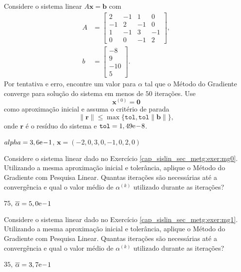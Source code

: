 \begin{exer}\label{cap_sislin_sec_metg:exer:mg1}
  Considere o sistema linear $A\pmb{x} = \pmb{b}$ com
  \begin{align}
    A &=
    \begin{bmatrix}
      2 & -1 & 1 & 0\\
      -1 & 2 & -1 & 0\\
      1 & -1 & 3 & -1 \\
      0 & 0 & -1 & 2
    \end{bmatrix},\\
    b &=
    \begin{bmatrix}
      -8\\
      9\\
      -10\\
      5
    \end{bmatrix}.
  \end{align}
  Por tentativa e erro, encontre um valor para $\alpha$ tal que o Método do Gradiente converge para solução do sistema em menos de $50$ iterações. Use
  \begin{equation}
    \pmb{x}^{(0)} = \pmb{0}
  \end{equation}
  como aproximação inicial e assuma o critério de parada
  \begin{equation}
    \|\pmb{r}\| \leq \max\{\texttt{tol}, \texttt{tol}\|\pmb{b}\|\},
  \end{equation}
  onde $\pmb{r}$ é o resíduo do sistema e $\texttt{tol} = 1,49\mathrm{e}\!-\!8$.
\end{exer}
\begin{resp}
  $alpha = 3,6\mathrm{e}\!-\!1$, $\pmb{x} = \left(-2,0, 3,0, -1,0, 2,0\right)$
\end{resp}


\begin{exer}
  Considere o sistema linear dado no Exercício \ref{cap_sislin_sec_metg:exer:mg0}. Utilizando a mesma aproximação inicial e tolerância, aplique o Método do Gradiente com Pesquisa Linear. Quantas iterações são necessárias até a convergência e qual o valor médio de $\alpha^{(k)}$ utilizado durante as iterações?
\end{exer}
\begin{resp}
  $75$, $\overline{\alpha} = 5,0\mathrm{e}\!-\!1$
\end{resp}

\begin{exer}
  Considere o sistema linear dado no Exercício \ref{cap_sislin_sec_metg:exer:mg1}. Utilizando a mesma aproximação inicial e tolerância, aplique o Método do Gradiente com Pesquisa Linear. Quantas iterações são necessárias até a convergência e qual o valor médio de $\alpha^{(k)}$ utilizado durante as iterações?
\end{exer}
\begin{resp}
  $35$, $\overline{\alpha} = 3,7\mathrm{e}\!-\!1$
\end{resp}

